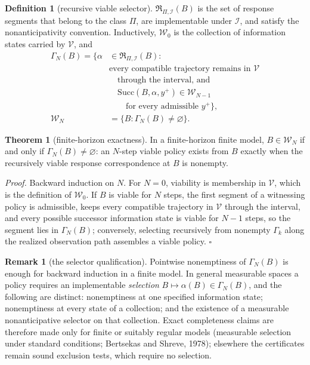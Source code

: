 \documentclass[10pt,twocolumn]{article}
\theoremstyle{definition}
\newtheorem{theorem}{Theorem}
\newtheorem{remark}{Remark}
\newtheorem{definition}{Definition}
\begin{document}
\begin{definition}[recursive viable selector]\label{def:gamma}
\(\mathfrak{R}_{\Pi,\mathcal{I}}(B)\) is the set of response segments that
belong to the class \(\Pi\), are implementable under \(\mathcal{I}\), and
satisfy the nonanticipativity convention. Inductively, \(\mathscr{W}_0\) is
the collection of information states carried by \(\mathcal{V}\), and
\begin{align*}
\Gamma_{N}(B) = \bigl\{ \alpha &\in \mathfrak{R}_{\Pi,\mathcal{I}}(B): \\
&\text{every compatible trajectory remains in } \mathcal{V}\\
&\quad\text{through the interval, and}\\
&\quad \mathrm{Succ}(B, \alpha, y^{+}) \in \mathscr{W}_{N-1}\\
&\qquad\text{for every admissible } y^{+}\bigr\},\\
\mathscr{W}_{N} &= \{ B : \Gamma_{N}(B) \neq \varnothing \}.
\end{align*}
\end{definition}

\begin{theorem}[finite-horizon exactness]\label{thm:exact}
In a finite-horizon finite model, \(B \in \mathscr{W}_{N}\) if and only if
\(\Gamma_{N}(B) \neq \varnothing\): an \(N\)-step viable policy exists from
\(B\) exactly when the recursively viable response correspondence at \(B\)
is nonempty.
\end{theorem}

\emph{Proof.} Backward induction on \(N\). For \(N = 0\), viability is
membership in \(\mathcal{V}\), which is the definition of
\(\mathscr{W}_0\). If \(B\) is viable for \(N\) steps, the first segment of
a witnessing policy is admissible, keeps every compatible trajectory in
\(\mathcal{V}\) through the interval, and every possible successor
information state is viable for \(N - 1\) steps, so the segment lies in
\(\Gamma_{N}(B)\); conversely, selecting recursively from nonempty
\(\Gamma_{k}\) along the realized observation path assembles a viable
policy. \hfill\(\square\)

\begin{remark}[the selector qualification]\label{rem:selection}
Pointwise nonemptiness of \(\Gamma_{N}(B)\) is enough for backward induction
in a finite model. In general measurable spaces a policy requires an
implementable \emph{selection} \(B \mapsto \alpha(B) \in \Gamma_{N}(B)\),
and the following are distinct: nonemptiness at one specified information
state; nonemptiness at every state of a collection; and the existence of a
measurable nonanticipative selector on that collection. Exact completeness
claims are therefore made only for finite or suitably regular models
(measurable selection under standard conditions; Bertsekas and Shreve,
1978); elsewhere the certificates remain sound exclusion tests, which
require no selection.
\end{remark}
\end{document}
